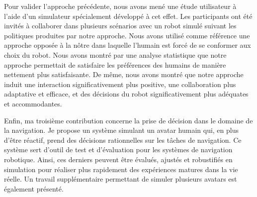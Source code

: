 Pour valider l'approche précédente, nous avons mené une étude utilisateur à l'aide d'un simulateur spécialement développé à cet effet. Les participants ont été invités à collaborer dans plusieurs scénarios avec un robot simulé suivant les politiques produites par notre approche. Nous avons utilisé comme référence une approche opposée à la nôtre dans laquelle l'humain est forcé de se conformer aux choix du robot. Nous avons montré par une analyse statistique que notre approche permettait de satisfaire les préférences des humains de manière nettement plus satisfaisante. De même, nous avons montré que notre approche induit une interaction significativement plus positive, une collaboration plus adaptative et efficace, et des décisions du robot significativement plus adéquates et accommodantes.

Enfin, ma troisième contribution concerne la prise de décision dans le domaine de la navigation. Je propose un système simulant un avatar humain qui, en plus d'être réactif, prend des décisions rationnelles sur les tâches de navigation. Ce système sert d'outil de test et d'évaluation pour les systèmes de navigation robotique. Ainsi, ces derniers peuvent être évalués, ajustés et robustifiés en simulation pour réaliser plus rapidement des expériences matures dans la vie réelle. Un travail supplémentaire permettant de simuler plusieurs avatars est également présenté.